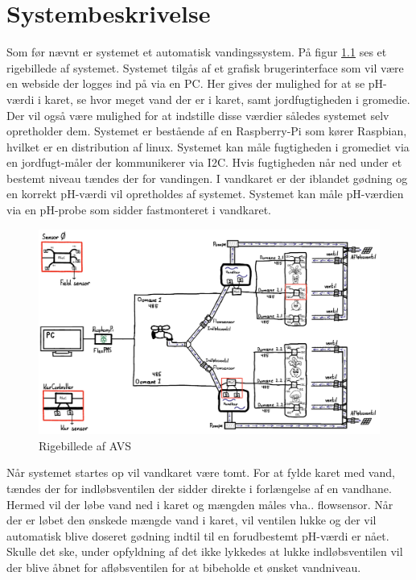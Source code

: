 \chapter{Systembeskrivelse}
Som før nævnt er systemet et automatisk vandingssystem. På figur \ref{photo:RigeBillede} ses et rigebillede af systemet. Systemet tilgås af et grafisk brugerinterface som vil være en webside der logges ind på via en PC. Her gives der mulighed for at se pH-værdi i karet, se hvor meget vand der er i karet, samt jordfugtigheden i gromedie. Der vil også være mulighed for at indstille disse værdier således systemet selv opretholder dem. Systemet er bestående af en  Raspberry-Pi som kører Raspbian, hvilket er en distribution af linux. Systemet kan måle fugtigheden i gromediet via en jordfugt-måler der kommunikerer via I2C.\newline 
Hvis fugtigheden når ned under et bestemt niveau tændes der for vandingen. I vandkaret er der iblandet gødning og en korrekt pH-værdi vil opretholdes af systemet. Systemet kan måle pH-værdien via en pH-probe som sidder fastmonteret i vandkaret.
 
\begin{figure}[H]
	\centering
	\includegraphics[scale=0.45]{Systembeskrivelse/AVS}
	\caption{Rigebillede af AVS}
	\label{photo:RigeBillede}
\end{figure}

Når systemet startes op vil vandkaret være tomt. For at fylde karet med vand, tændes der for indløbsventilen der sidder direkte i forlængelse af en vandhane. Hermed vil der løbe vand ned i karet og mængden måles vha.. flowsensor. Når der er løbet den ønskede mængde vand i karet, vil ventilen lukke og der vil automatisk blive doseret gødning indtil til en forudbestemt pH-værdi er nået. Skulle det ske, under opfyldning af det ikke lykkedes at lukke indløbsventilen vil der blive åbnet for afløbsventilen for at bibeholde et ønsket vandniveau.

